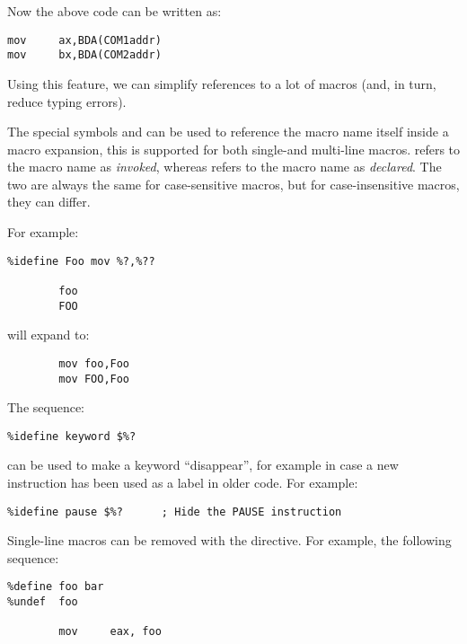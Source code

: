 Now the above code can be written as:

\begin{lstlisting}
mov     ax,BDA(COM1addr)
mov     bx,BDA(COM2addr)
\end{lstlisting}

Using this feature, we can simplify references to a lot of macros
(and, in turn, reduce typing errors).


The special symbols  and  can be used to
reference the macro name itself inside a macro expansion,
this is supported for both single-and multi-line macros.
 refers to the macro name as \emph{invoked}, whereas
 refers to the macro name as \emph{declared}.
The two are always the same for case-sensitive macros, but
for case-insensitive macros, they can differ.

For example:

\begin{lstlisting}
%idefine Foo mov %?,%??

        foo
        FOO
\end{lstlisting}

will expand to:

\begin{lstlisting}
        mov foo,Foo
        mov FOO,Foo
\end{lstlisting}

The sequence:

\begin{lstlisting}
%idefine keyword $%?
\end{lstlisting}

can be used to make a keyword ``disappear'', for example in case a new
instruction has been used as a label in older code.  For example:

\begin{lstlisting}
%idefine pause $%?      ; Hide the PAUSE instruction
\end{lstlisting}


Single-line macros can be removed with the  directive.
For example, the following sequence:

\begin{lstlisting}
%define foo bar
%undef  foo

        mov     eax, foo
\end{lstlisting}

